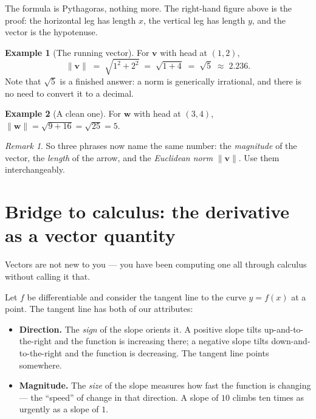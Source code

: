 \documentclass[11pt]{article}
\theoremstyle{definition}
\newtheorem{ex}{Example}
\theoremstyle{remark}
\newtheorem*{rmk}{Remark}
\newcommand{\vc}[1]{\mathbf{#1}}
\newcommand{\norm}[1]{\lVert #1\rVert}
\begin{document}
\noindent The formula is Pythagoras, nothing more. The right-hand figure above
is the proof: the horizontal leg has length $x$, the vertical leg has length
$y$, and the vector is the hypotenuse.

\begin{ex}[The running vector]
For $\vc{v}$ with head at $(1,2)$,
\[
  \norm{\vc{v}} \;=\; \sqrt{1^{2}+2^{2}} \;=\; \sqrt{1+4} \;=\; \sqrt{5}
  \;\approx\; 2.236.
\]
Note that $\sqrt{5}$ is a finished answer: a norm is generically irrational, and
there is no need to convert it to a decimal.
\end{ex}

\begin{ex}[A clean one]
For $\vc{w}$ with head at $(3,4)$,
$\norm{\vc{w}}=\sqrt{9+16}=\sqrt{25}=5$.
\end{ex}

\begin{rmk}
So three phrases now name the same number: the \emph{magnitude} of the vector,
the \emph{length} of the arrow, and the \emph{Euclidean norm} $\norm{\vc{v}}$.
Use them interchangeably.
\end{rmk}

\section{Bridge to calculus: the derivative as a vector quantity}
Vectors are not new to you --- you have been computing one all through calculus
without calling it that.

Let $f$ be differentiable and consider the tangent line to the curve $y=f(x)$ at
a point. The tangent line has both of our attributes:

\begin{itemize}[leftmargin=1.4em,itemsep=3pt]
  \item \textbf{Direction.} The \emph{sign} of the slope orients it. A positive
        slope tilts up-and-to-the-right and the function is increasing there; a
        negative slope tilts down-and-to-the-right and the function is
        decreasing. The tangent line points somewhere.
  \item \textbf{Magnitude.} The \emph{size} of the slope measures how fast the
        function is changing --- the ``speed'' of change in that direction. A
        slope of $10$ climbs ten times as urgently as a slope of $1$.
\end{itemize}
\end{document}
